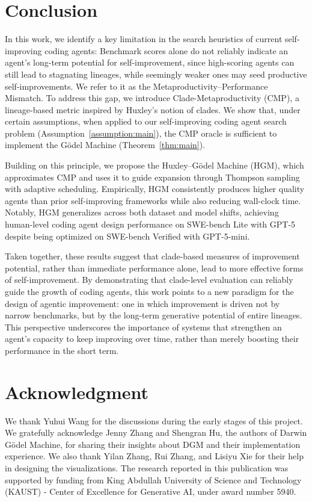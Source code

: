 \documentclass{article} %
\begin{document}
\section{Conclusion}
In this work, we identify a key limitation in the search heuristics of current self-improving coding agents: Benchmark scores alone do not reliably indicate an agent’s long-term potential for self-improvement, since high-scoring agents can still lead to stagnating lineages, while seemingly weaker ones may seed productive self-improvements. We refer to it as the Metaproductivity–Performance Mismatch. To address this gap, we introduce Clade-Metaproductivity ($\mathrm{CMP}$), a lineage-based metric inspired by Huxley’s notion of clades.
We show that, under certain assumptions, when applied to our self-improving coding agent search problem (Assumption~\ref{assumption:main}), the $\mathrm{CMP}$ oracle is sufficient to implement the G\"odel Machine (Theorem~\ref{thm:main}).

Building on this principle, we propose the Huxley–G\"odel Machine (HGM), which approximates $\mathrm{CMP}$ and uses it to guide expansion through Thompson sampling with adaptive scheduling. Empirically, HGM consistently produces higher quality agents than prior self-improving frameworks while also reducing wall-clock time. Notably, HGM generalizes across both dataset and model shifts, achieving human-level coding agent design performance on SWE-bench Lite with GPT-5 despite being optimized on SWE-bench Verified with GPT-5-mini.

Taken together, these results suggest that clade-based measures of improvement potential, rather than immediate performance alone, lead to more effective forms of self-improvement. By demonstrating that clade-level evaluation can reliably guide the growth of coding agents, this work points to a new paradigm for the design of agentic improvement: one in which improvement is driven not by narrow benchmarks, but by the long-term generative potential of entire lineages. This perspective underscores the importance of systems that strengthen an agent’s capacity to keep improving over time, rather than merely boosting their performance in the short term.

\section*{Acknowledgment}
We thank Yuhui Wang for the discussions during the early stages of this project. We gratefully acknowledge Jenny Zhang and Shengran Hu, the authors of Darwin G\"odel Machine, for sharing their insights about DGM and their implementation experience. We also thank Yilan Zhang, Rui Zhang, and Lisiyu Xie for their help in designing the visualizations.
The research reported in this publication was supported by funding from King Abdullah University of Science and Technology (KAUST) - Center of Excellence for Generative AI, under award number 5940.
\end{document}
